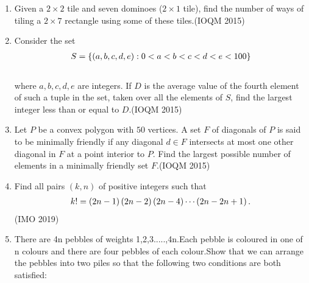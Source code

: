 \begin{enumerate}
	\item Given a $2 \times 2$ tile and seven dominoes ($2 \times 1$ tile), find the number of ways of tiling a $2 \times 7$ rectangle using some of these tiles.\hfill(IOQM 2015)
    
    \item Consider the set 
	    \begin{align}
		    S = \left\{\left(a, b, c, d, e\right) : 0 < a < b < c < d < e < 100\right\}
	    \end{align}
\\where $a, b, c, d, e$ are integers. If $D$ is the average value of the fourth element of such a tuple in the set, taken over all the elements of $S$, find the largest integer less than or equal to $D$.\hfill(IOQM 2015)
    
    \item Let $P$ be a convex polygon with $50$ vertices. A set $F$ of diagonals of $P$ is said to be minimally friendly if any diagonal $d \in F$ intersects at most one other diagonal in $F$ at a point interior to $P$. Find the largest possible number of elements in a minimally friendly set $F$.\hfill(IOQM 2015)
    \item Find all pairs $(k, n)$ of positive integers such that
\begin{align}
k! = \left(2n - 1\right)\left(2n - 2\right)\left(2n - 4\right) \cdots \left(2n - 2n + 1\right).
\end{align}
\hfill(IMO 2019)
\item There are 4n pebbles of weights 1,2,3.....,4n.Each pebble is coloured in one of n colours and there are four pebbles of each colour.Show that we can arrange the pebbles into two piles so that the following two conditions are both satisfied:


\end{enumerate}
